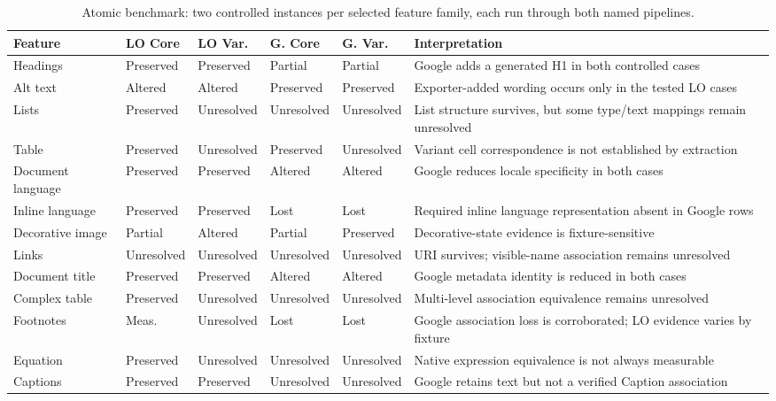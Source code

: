 \begin{table}[t]
\centering\scriptsize
\caption{Atomic benchmark: two controlled instances per selected feature family, each run through both named pipelines.}
\label{tab:results}
\begin{tabular}{p{}p{}p{}p{}p{}p{}}
\hline
Feature & LO Core & LO Var. & G. Core & G. Var. & Interpretation \\
\hline
Headings & Preserved & Preserved & Partial & Partial & Google adds a generated H1 in both controlled cases \\
Alt text & Altered & Altered & Preserved & Preserved & Exporter-added wording occurs only in the tested LO cases \\
Lists & Preserved & Unresolved & Unresolved & Unresolved & List structure survives, but some type/text mappings remain unresolved \\
Table & Preserved & Unresolved & Preserved & Unresolved & Variant cell correspondence is not established by extraction \\
Document language & Preserved & Preserved & Altered & Altered & Google reduces locale specificity in both cases \\
Inline language & Preserved & Preserved & Lost & Lost & Required inline language representation absent in Google rows \\
Decorative image & Partial & Altered & Partial & Preserved & Decorative-state evidence is fixture-sensitive \\
Links & Unresolved & Unresolved & Unresolved & Unresolved & URI survives; visible-name association remains unresolved \\
Document title & Preserved & Preserved & Altered & Altered & Google metadata identity is reduced in both cases \\
Complex table & Preserved & Unresolved & Unresolved & Unresolved & Multi-level association equivalence remains unresolved \\
Footnotes & Meas. & Unresolved & Lost & Lost & Google association loss is corroborated; LO evidence varies by fixture \\
Equation & Preserved & Unresolved & Unresolved & Unresolved & Native expression equivalence is not always measurable \\
Captions & Preserved & Preserved & Unresolved & Unresolved & Google retains text but not a verified Caption association \\
\hline
\end{tabular}
\end{table}

